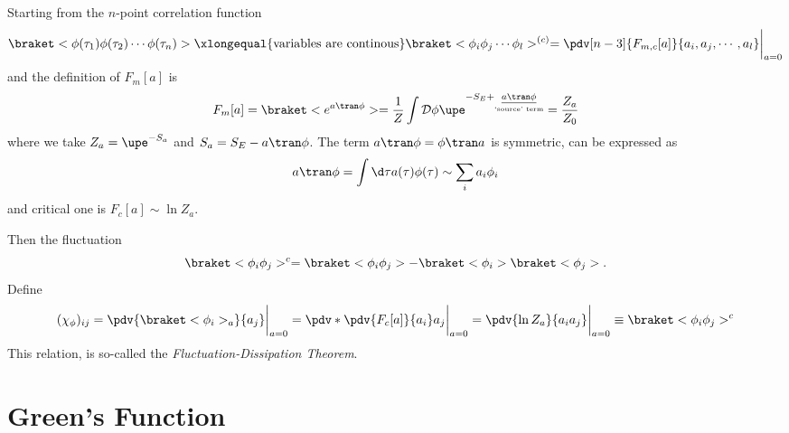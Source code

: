 Starting from the $n$-point correlation function
\[
  \braket<\phi(\tau_1) \phi(\tau_2) \cdots \phi(\tau_n)>
  \xlongequal{\text{variables are continous}}
  \braket<\phi_i \phi_j \cdots \phi_l>^{(c)} =
  \pdv[n-3]{F_{m,c}[a]}{a_i, a_j, \cdots, a_l} \bigg|_{a=0}
\]
and the definition of $F_m[a]$ is
\[
  F_m[a] = \braket<e^{a\tran\phi}>
= \frac1Z \int \mathcal D\phi
  \upe^{-S_E + \underset{\text{`source' term}}{\underline{a\tran\phi}}}
= \frac{Z_a}{Z_0}
\]
where we take $Z_a = \upe^{-S_a}$ and $S_a = S_E - a\tran\phi$.
The term $a\tran\phi = \phi\tran a$ is symmetric, can be expressed as
\[
  a\tran\phi = \int \d\tau a(\tau) \phi(\tau) \sim \sum_i a_i \phi_i
\]
and critical one is $F_c[a] \sim \ln Z_a$.

Then the fluctuation
\[
  \braket<\phi_i\phi_j>^c
= \braket<\phi_i\phi_j> - \braket<\phi_i>\braket<\phi_j>.
\]
Define
\[
  (\chi_\phi)_{ij} = \pdv{\braket<\phi_i>_a}{a_j}\bigg|_{a=0}
= \pdv*{\pdv{F_c[a]}{a_i}}{a_j} \bigg|_{a=0}
= \pdv{\ln Z_a}{a_i a_j} \bigg|_{a=0} \equiv \braket<\phi_i\phi_j>^c
\]
This relation, is so-called the \emph{Fluctuation-Dissipation Theorem}.

\section{Green's Function}

